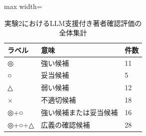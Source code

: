 \begin{table}[tbp]
\centering
\small
\caption{実験2におけるLLM支援付き著者確認評価の全体集計}
\label{tab:experiment2_label_summary_table}
\begin{adjustbox}{max width=\textwidth}
\begin{tabular}{lll}
\toprule
ラベル & 意味 & 件数 \\
\midrule
◎ & 強い候補 & 11 \\
○ & 妥当候補 & 5 \\
△ & 弱い候補 & 12 \\
× & 不適切候補 & 18 \\
◎+○ & 強い候補または妥当候補 & 16 \\
◎+○+△ & 広義の確認候補 & 28 \\
\bottomrule
\end{tabular}
\end{adjustbox}
\end{table}
